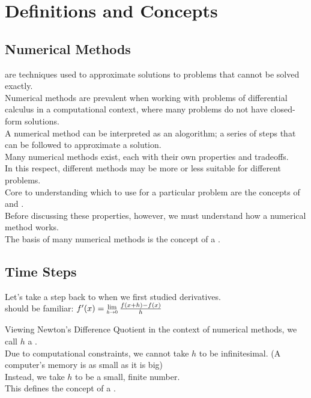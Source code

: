 \section{Definitions and Concepts}

\subsection{Numerical Methods}
\par {} are techniques used to approximate solutions to problems that cannot be solved exactly.\\
Numerical methods are prevalent when working with problems of differential calculus in a computational context, where many problems do not have closed-form solutions.\\
A numerical method can be interpreted as an alogorithm; a series of steps that can be followed to approximate a solution.\\
Many numerical methods exist, each with their own properties and tradeoffs.\\
In this respect, different methods may be more or less suitable for different problems.\\
Core to understanding which to use for a particular problem are the concepts of  and .\\
Before discussing these properties, however, we must understand how a numerical method works.\\
The basis of many numerical methods is the concept of a .

\subsection{Time Steps}
Let's take a step back to when we first studied derivatives.\\
 should be familiar: 
$f'(x) = \Lim{h \to 0} \frac{f(x+h) - f(x)}{h}$

\par Viewing Newton's Difference Quotient in the context of numerical methods, we call $h$ a .\\
Due to computational constraints, we cannot take $h$ to be infinitesimal. (A computer's memory is as small as it is big)\\
Instead, we take $h$ to be a small, finite number.\\
This defines the concept of a .\\

